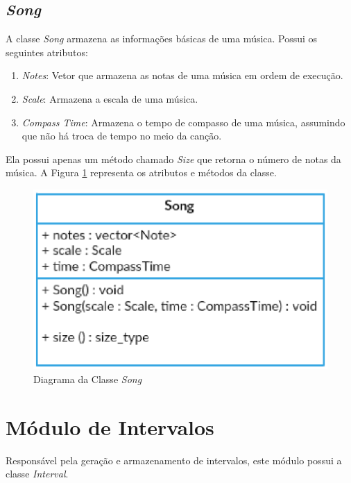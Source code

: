    \subsection[\textit{Song}]{\textit{Song}}

      A classe \textit{Song} armazena as informações básicas de uma música. Possui os seguintes atributos:

      \begin{enumerate}
        \item \textit{Notes}: Vetor que armazena as notas de uma música em ordem de execução.
        \item \textit{Scale}: Armazena a escala de uma música.
        \item \textit{Compass Time}: Armazena o tempo de compasso de uma música, assumindo que não há troca de tempo no meio da canção.
      \end{enumerate}

      Ela possui apenas um método chamado \textit{Size} que retorna o número de notas da música. A Figura \ref{songclass} representa os atributos e métodos da classe.

      \begin{figure}[htb]
        \centering
        \includegraphics[scale=0.7]{figuras/songclass.eps}
        \caption{Diagrama da Classe \textit{Song}}
        \label{songclass}
      \end{figure}


  \section[Módulo de Intervalos]{Módulo de Intervalos}

    Responsável pela geração e armazenamento de intervalos, este módulo possui a classe \textit{Interval}.


